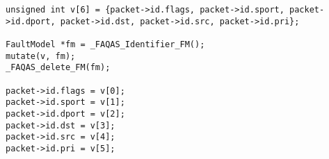 
\begin{lstlisting}[style=CStyle, caption=Data-driven mutation example on libgscsp (csp\_io.c excerpt)., label=csp_integration]
unsigned int v[6] = {packet->id.flags, packet->id.sport, packet->id.dport, packet->id.dst, packet->id.src, packet->id.pri};

FaultModel *fm = _FAQAS_Identifier_FM();                                                                                          
mutate(v, fm);
_FAQAS_delete_FM(fm);

packet->id.flags = v[0];
packet->id.sport = v[1];
packet->id.dport = v[2]; 
packet->id.dst = v[3]; 
packet->id.src = v[4]; 
packet->id.pri = v[5]; 
\end{lstlisting}